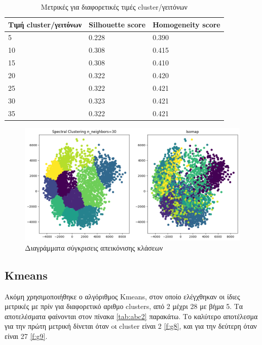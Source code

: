 \begin{table}[ht]
	\centering
	\caption{Μετρικές για διαφορετικές τιμές cluster/γειτόνων}
	\begin{tabular}{l | l | l}
		Τιμή cluster/γειτόνων & Silhouette score &  Homogeneity score\\
		\hline
		5 & 0.228 & 0.390\\
		10 & 0.308 & 0.415\\
		15 & 0.308&0.410\\
		20 & 0.322 & 0.420\\
		25 &0.322 & 0.421\\
		30 & 0.323 & 0.421\\
		35 & 0.322 & 0.421\\
	\end{tabular}
	
	\label{tab:abc3}
\end{table}
\begin{figure}[ht]
	\centering
	\includegraphics[width=1\linewidth]{Imagedata1/n_30isomap.png}
	\caption{ Διαγράμματα σύγκρισεις απεικόνισης κλάσεων }
	\label{f:g7}	
\end{figure}

\subsection{Kmeans}
Ακόμη χρησιμοποιήθηκε ο αλγόριθμος Kmeans, στον οποίο ελέγχθηκαν οι ίδιες μετρικές με πρίν για διαφορετικό αριθμο clusters, από 2 μέχρι 28 με βήμα 5. Τα αποτελέσματα φαίνονται στον πίνακα \ref{tab:abc2} παρακάτω. Το καλύτερο αποτέλεσμα για την πρώτη μετρική δίνεται όταν oι cluster είναι 2 \ref{f:g8}, και για την δεύτερη όταν είναι 27 \ref{f:g9}.

